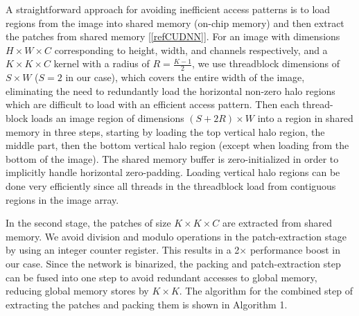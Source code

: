 \documentclass[conference,compsoc]{IEEEtran}
\newcommand{\prosaic}[1]{#1}
\begin{document}
A straightforward approach for avoiding inefficient access patterns is to load regions from the image into shared memory (on-chip memory) and then extract the patches from shared memory [\ref{refCUDNN}]. For an image with dimensions $H\times W\times C$ corresponding to height, width, and channels respectively, and a $K\times K \times C$ kernel with a radius of $R=\frac{K-1}{2}$, we use threadblock dimensions of $S\times W$ ($S=2$ in our case), which covers the entire width of the image, eliminating the need to redundantly load the horizontal non-zero halo regions which are difficult to load with an efficient access pattern. Then each thread-block loads an image region of dimensions $(S + 2R)\times W$ into a region in shared memory in three steps, starting by loading the top vertical halo region, the middle part, then the bottom vertical halo region (except when loading from the bottom of the image). The shared memory buffer is zero-initialized in order to implicitly handle horizontal zero-padding. Loading vertical halo regions can be done very efficiently since all threads in the threadblock load from contiguous regions in the image array.

In the second stage, the patches of size $K\times K \times C$ are extracted from shared memory.  We avoid division and modulo operations in the patch-extraction stage by using an integer counter register. This results in a 2$\times$ performance boost in our case. Since the network is binarized, the packing and patch-extraction step can be fused into one step to avoid redundant accesses to global memory, reducing global memory stores by $K\times K$. The algorithm for the combined step of extracting the patches and packing them is shown in Algorithm 1.


\end{document}
